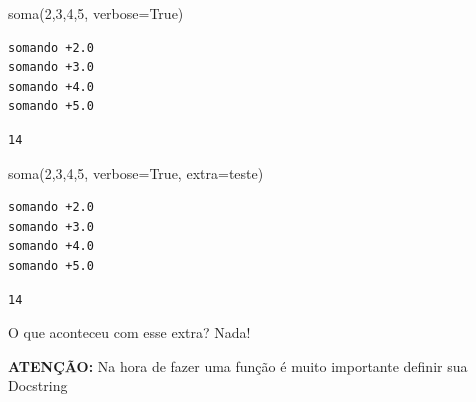 \documentclass[
  letterpaper,
  DIV=11,
  numbers=noendperiod]{scrreprt}
\newenvironment{Shaded}{\begin{snugshade}}{\end{snugshade}}
\newcommand{\DecValTok}[1]{\textcolor[rgb]{0.68,0.00,0.00}{#1}}
\newcommand{\NormalTok}[1]{\textcolor[rgb]{0.00,0.23,0.31}{#1}}
\newcommand{\OperatorTok}[1]{\textcolor[rgb]{0.37,0.37,0.37}{#1}}
\newcommand{\StringTok}[1]{\textcolor[rgb]{0.13,0.47,0.30}{#1}}
\newcommand{\VariableTok}[1]{\textcolor[rgb]{0.07,0.07,0.07}{#1}}
\begin{document}
\begin{Shaded}
\begin{Highlighting}[]
\NormalTok{soma(}\DecValTok{2}\NormalTok{,}\DecValTok{3}\NormalTok{,}\DecValTok{4}\NormalTok{,}\DecValTok{5}\NormalTok{, verbose}\OperatorTok{=}\VariableTok{True}\NormalTok{)}
\end{Highlighting}
\end{Shaded}

\begin{verbatim}
somando +2.0
somando +3.0
somando +4.0
somando +5.0
\end{verbatim}

\begin{verbatim}
14
\end{verbatim}

\begin{Shaded}
\begin{Highlighting}[]
\NormalTok{soma(}\DecValTok{2}\NormalTok{,}\DecValTok{3}\NormalTok{,}\DecValTok{4}\NormalTok{,}\DecValTok{5}\NormalTok{, verbose}\OperatorTok{=}\VariableTok{True}\NormalTok{, extra}\OperatorTok{=}\StringTok{\textquotesingle{}teste\textquotesingle{}}\NormalTok{)}
\end{Highlighting}
\end{Shaded}

\begin{verbatim}
somando +2.0
somando +3.0
somando +4.0
somando +5.0
\end{verbatim}

\begin{verbatim}
14
\end{verbatim}

O que aconteceu com esse extra? Nada!

\textbf{ATENÇÃO:} Na hora de fazer uma função é muito importante definir
sua Docstring
\end{document}
